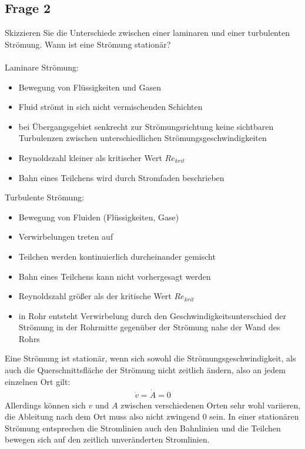 \documentclass[a4paper,10pt]{scrartcl}
\begin{document}
		\subsection{Frage 2}
			Skizzieren Sie die Unterschiede zwischen einer laminaren und einer turbulenten Strömung.
			Wann ist eine Strömung stationär?\\
			\\
			Laminare Strömung:
			\begin{itemize}
				\item Bewegung von Flüssigkeiten und Gasen
				\item Fluid strömt in sich nicht vermischenden Schichten
				\item bei Übergangsgebiet senkrecht zur Strömungsrichtung keine sichtbaren Turbulenzen zwischen unterschiedlichen Strömungsgeschwindigkeiten
				\item Reynoldszahl kleiner als kritischer Wert \(Re_{krit}\)
				\item Bahn eines Teilchens wird durch \glqq Stromfaden\grqq{} beschrieben
			\end{itemize}
			
			Turbulente Strömung:
			\begin{itemize}
				\item Bewegung von Fluiden (Flüssigkeiten, Gase)
				\item Verwirbelungen treten auf
				\item Teilchen werden kontinuierlich durcheinander gemischt
				\item Bahn eines Teilchens kann nicht vorhergesagt werden
				\item Reynoldszahl größer als der kritische Wert \(Re_{krit}\)
				\item in Rohr entsteht Verwirbelung durch den Geschwindigkeitsunterschied der Strömung in der Rohrmitte gegenüber der Strömung nahe der Wand des Rohrs
			\end{itemize}
			
			Eine Strömung ist stationär, wenn sich sowohl die Strömungsgeschwindigkeit, als auch die Querschnittsfläche der Strömung nicht zeitlich ändern, also an jedem einzelnen Ort gilt:
			\begin{align*}
			\dot v=\dot A=0
			\end{align*}
			Allerdings können sich \(v\) und \(A\) zwischen verschiedenen Orten sehr wohl variieren, die Ableitung nach dem Ort muss also nicht zwingend 0 sein. In einer stationären Strömung entsprechen die Stromlinien auch den Bahnlinien und die Teilchen bewegen sich auf den zeitlich unveränderten Stromlinien.
			
\end{document}
